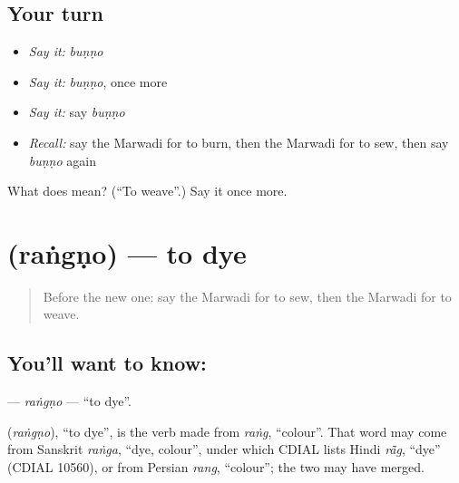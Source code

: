 \subsection*{Your turn}
\begin{itemize}
\raggedright
  \item \emph{Say it:} \emph{buṇṇo}
  \item \emph{Say it:} \emph{buṇṇo}, once more
  \item \emph{Say it:} say \emph{buṇṇo}
  \item \emph{Recall:} say the Marwadi for to burn, then the Marwadi for to sew, then say \emph{buṇṇo} again
\end{itemize}

\begin{tcolorbox}[breakable,colback=teal!4,colframe=teal!35!black,title={Before you move on}]
What does  mean? (\textquotedblleft{}To weave\textquotedblright{}.) Say it once more.
\end{tcolorbox}
\section[\texorpdfstring{\mw{रंगणो} (raṅgṇo)}{रंगणो (raṅgṇo)}]{ (raṅgṇo) — to dye}

\label{lesson:MW-C107-rangno}



\begin{quote}
Before the new one: say the Marwadi for to sew, then the Marwadi for to weave.
\end{quote}

\subsection*{You'll want to know: }
\textbf{} — \emph{raṅgṇo} — \textquotedblleft{}to dye\textquotedblright{}.

\begin{cousinweb}
\textbf{} (\emph{raṅgṇo}), \textquotedblleft{}to dye\textquotedblright{}, is the verb made from \emph{raṅg}, \textquotedblleft{}colour\textquotedblright{}. That word may come from Sanskrit \emph{raṅga}, \textquotedblleft{}dye, colour\textquotedblright{}, under which CDIAL lists Hindi \emph{rā̃g}, \textquotedblleft{}dye\textquotedblright{} (CDIAL 10560), or from Persian \emph{rang}, \textquotedblleft{}colour\textquotedblright{}; the two may have merged.
\end{cousinweb}

